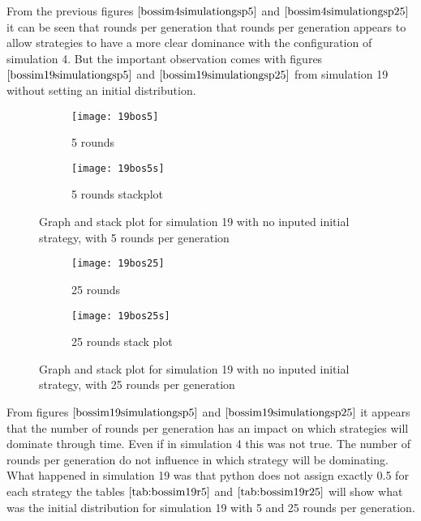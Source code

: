 From the previous figures $\ref{bossim4simulationgsp5}$ and $\ref{bossim4simulationgsp25}$ it can be seen that rounds per generation that rounds per generation appears to allow strategies to have a more clear dominance with the configuration of simulation 4. But the important observation comes with figures $\ref{bossim19simulationgsp5}$ and $\ref{bossim19simulationgsp25}$ from simulation 19 without setting an initial distribution.

\begin{figure}[H]       
    \centering
    \begin{subfigure}[b]{0.4\textwidth}
	\centering
	{\texttt{[image: 19bos5]}}   
    	\caption{5 rounds}
	\label{fig:bossim19r5}
    \end{subfigure}
    \hfill
    \begin{subfigure}[b]{0.4\textwidth}
	\centering
	{\texttt{[image: 19bos5s]}}   
    	\caption{5 rounds stackplot}
	\label{fig:bossim19rs5}
    \end{subfigure}
    \caption{Graph and stack plot for simulation 19 with no inputed initial strategy, with 5 rounds per generation}
    \label{bossim19simulationgsp5}
\end{figure}

\begin{figure}[H]       
    \centering
    \begin{subfigure}[b]{0.4\textwidth}
	\centering
	{\texttt{[image: 19bos25]}}   
    	\caption{25 rounds}
	\label{fig:bossim19r25}
    \end{subfigure}
    \hfill
    \begin{subfigure}[b]{0.4\textwidth}
	\centering
	{\texttt{[image: 19bos25s]}}   
    	\caption{25 rounds stack plot}
	\label{fig:bossim19rs25}
    \end{subfigure}
    \caption{Graph and stack plot for simulation 19 with no inputed initial strategy, with 25 rounds per generation}
    \label{bossim19simulationgsp25}
\end{figure}
From figures $\ref{bossim19simulationgsp5}$ and $\ref{bossim19simulationgsp25}$  it appears that the number of rounds per generation has an impact on which strategies will dominate through time. Even if  in simulation 4 this was not true. The number of rounds per generation do not influence in which strategy will be dominating. What happened in simulation 19 was that python does not assign exactly 0.5 for each strategy the tables $\ref{tab:bossim19r5}$ and $\ref{tab:bossim19r25}$  will show what was the initial distribution for simulation 19 with 5 and 25 rounds per generation.

